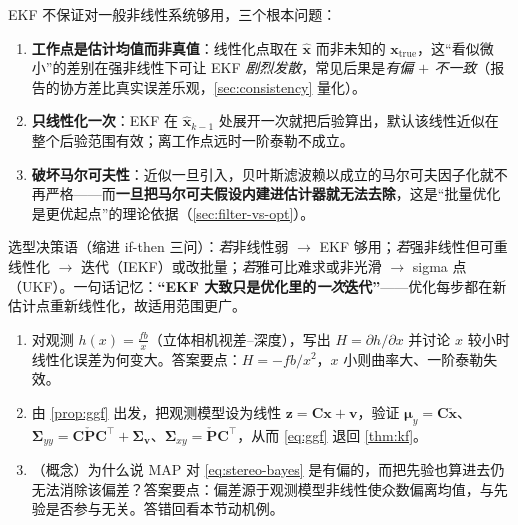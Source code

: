 \begin{pitfall}
EKF 不保证对一般非线性系统够用，三个根本问题\cite{barfoot2024state,gaoxiang2019slam14}：
\begin{enumerate}
  \item \textbf{工作点是估计均值而非真值}：线性化点取在 $\hat{\mathbf{x}}$ 而非未知的 $\mathbf{x}_{\text{true}}$，这“看似微小”的差别在强非线性下可让 EKF \emph{剧烈发散}，常见后果是\emph{有偏 $+$ 不一致}（报告的协方差比真实误差乐观，\cref{sec:consistency} 量化）。
  \item \textbf{只线性化一次}：EKF 在 $\hat{\mathbf{x}}_{k-1}$ 处展开一次就把后验算出，默认该线性近似在整个后验范围有效；离工作点远时一阶泰勒不成立。
  \item \textbf{破坏马尔可夫性}：近似一旦引入，贝叶斯滤波赖以成立的马尔可夫因子化就不再严格——而\textbf{一旦把马尔可夫假设内建进估计器就无法去除}，这是“批量优化是更优起点”的理论依据（\cref{sec:filter-vs-opt}）。
\end{enumerate}
选型决策语（缩进 if-then 三问）：\emph{若}非线性弱 $\to$ EKF 够用；\emph{若}强非线性但可重线性化 $\to$ 迭代（IEKF）或改批量；\emph{若}雅可比难求或非光滑 $\to$ sigma 点（UKF）。一句话记忆：\textbf{“EKF 大致只是优化里的\emph{一次}迭代”}——优化每步都在新估计点重新线性化，故适用范围更广\cite{gaoxiang2019slam14}。
\end{pitfall}

\begin{practice}
\begin{enumerate}
  \item 对观测 $h(x)=\tfrac{fb}{x}$（立体相机视差–深度），写出 $H=\partial h/\partial x$ 并讨论 $x$ 较小时线性化误差为何变大。答案要点：$H=-fb/x^2$，$x$ 小则曲率大、一阶泰勒失效。
  \item 由 \cref{prop:ggf} 出发，把观测模型设为线性 $\mathbf{z}=\mathbf{C}\mathbf{x}+\mathbf{v}$，验证 $\boldsymbol{\mu}_y=\mathbf{C}\check{\mathbf{x}}$、$\boldsymbol{\Sigma}_{yy}=\mathbf{C}\check{\mathbf{P}}\mathbf{C}^\top+\boldsymbol{\Sigma}_{\mathbf{v}}$、$\boldsymbol{\Sigma}_{xy}=\check{\mathbf{P}}\mathbf{C}^\top$，从而 \cref{eq:ggf} 退回 \cref{thm:kf}。
  \item （概念）为什么说 MAP 对 \cref{eq:stereo-bayes} 是有偏的，而把先验也算进去仍无法消除该偏差？答案要点：偏差源于观测模型非线性使众数偏离均值，与先验是否参与无关。答错回看本节动机例。
\end{enumerate}
\end{practice}

